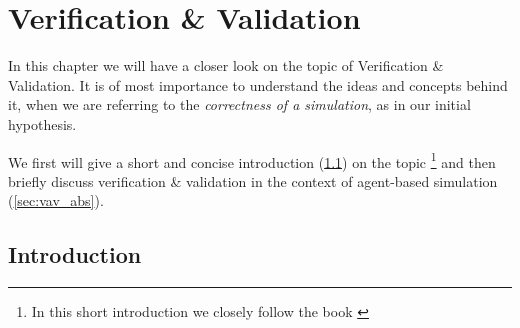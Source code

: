 \chapter{Verification \& Validation}
\label{chap:v_and_v}

In this chapter we will have a closer look on the topic of Verification \& Validation. It is of most importance to understand the ideas and concepts behind it, when we are referring to the \textit{correctness of a simulation}, as in our initial hypothesis. 

We first will give a short and concise introduction (\ref{sec:vav_introduction}) on the topic \footnote{In this short introduction we closely follow the book \cite{robinson_simulation:_2014}} and then briefly discuss verification \& validation in the context of agent-based simulation (\ref{sec:vav_abs}).


\section{Introduction}
\label{sec:vav_introduction}
%
%

